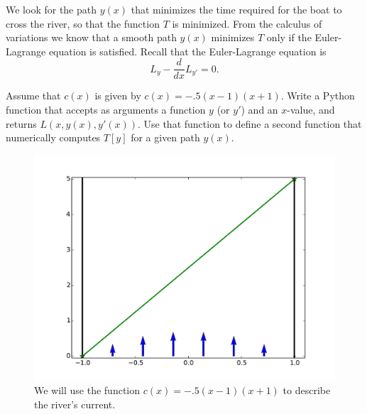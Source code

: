 We look for the path $y(x)$ that minimizes the time required for the boat to cross the river, so that the function $T$ is minimized. From the calculus of variations we know that a smooth path $y(x)$ minimizes $T$ only if the Euler-Lagrange equation is satisfied. Recall that the Euler-Lagrange equation is 
\[
L_{y} - \frac{d}{dx}L_{y'} = 0.
\]



\begin{problem}
	Assume that $c(x)$ is given by $c(x) = -.5(x-1)(x+1)$.%
	Write a Python function that accepts as arguments a function $y$ (or $y'$) and an $x$-value, and returns $L(x,y(x),y'(x))$. Use that function to define a second function that numerically computes $T[y]$ for a given path $y(x)$.
\end{problem}



\begin{figure}
\centering
\includegraphics[width=\textwidth]{rivercurrent.pdf}
\caption{We will use the function $c(x) = -.5(x-1)(x+1)$ to describe the river's current.}
\label{fig:rivercrossing_current}
\end{figure}








